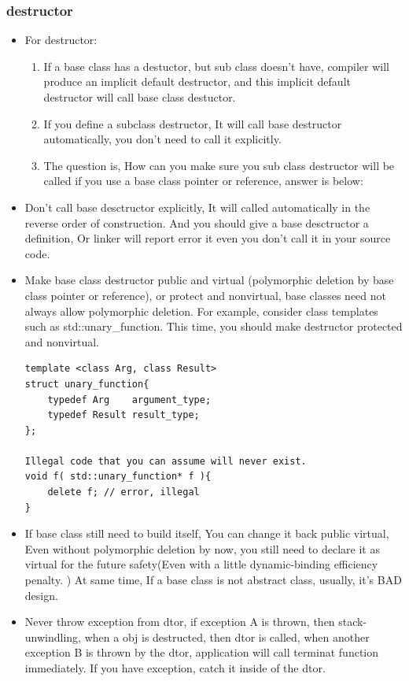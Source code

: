 \documentclass[a4paper,11pt,twoside]{book}
\begin{document}
\subsubsection{destructor}
\begin{itemize}
	\item For destructor:
	\begin{enumerate}
		\item If a base class has a destuctor, but sub class doesn't have,  compiler will produce an implicit default destructor, and this implicit default destructor will call base class destuctor.
		
		\item If you define a subclass destructor, It will call base destructor automatically, you don't need to call it explicitly.
		
		\item The question is, How can you make sure you sub class destructor will be called if you use a base class pointer or reference, answer is below:
	\end{enumerate}
	
	\item Don't call base desctructor explicitly, It will called automatically in the reverse order of construction.  And you should give a base desctructor a definition, Or linker will report error it even you don't call it in your source code.
	
	\item Make base class destructor public and virtual (polymorphic deletion by base class pointer or reference), or protect and nonvirtual, base classes need not always allow polymorphic deletion. For example, consider class templates such as std::unary\_function. This time, you should make destructor protected and nonvirtual.
\begin{lstlisting}[numbers=none]
template <class Arg, class Result>
struct unary_function{
	typedef Arg    argument_type;
	typedef Result result_type;
};
	
Illegal code that you can assume will never exist.
void f( std::unary_function* f ){
	delete f; // error, illegal
}
\end{lstlisting}
	
	\item If base class still need to build itself, You can change it back public virtual,  Even without polymorphic deletion by now, you still need to declare it as virtual for the future safety(Even with a little dynamic-binding efficiency penalty. ) At same time, If a base class is not abstract class, usually, it's BAD design.
	
	\item Never throw exception from dtor, if exception A is thrown, then stack-unwindling, when a obj is destructed, then dtor is called, when another exception B is thrown by the dtor, application will call terminat function immediately.  If you have exception, catch it inside of the dtor.
	
\end{itemize}
\end{document}
